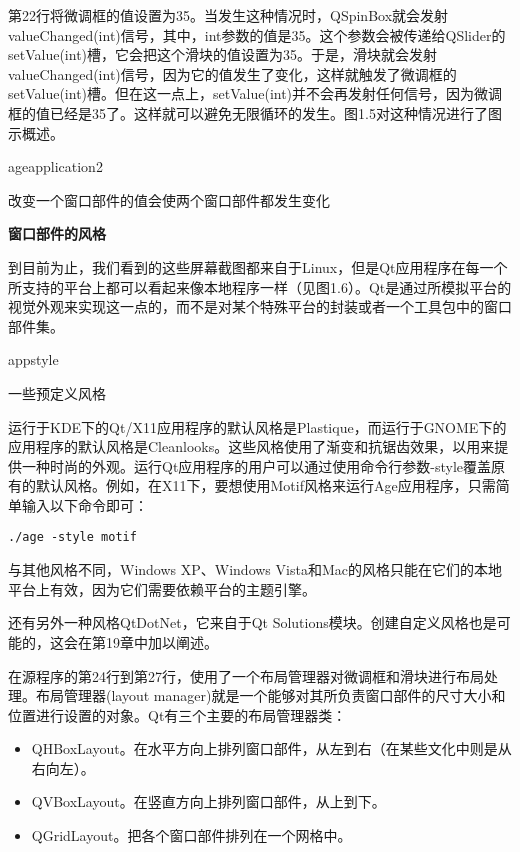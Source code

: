 \documentclass[11pt,oneside]{book}
\begin{document}
\begin{common-format}
第22行将微调框的值设置为35。当发生这种情况时，QSpinBox就会发射valueChanged(int)信号，其中，int参数的值是35。这个参数会被传递给QSlider的setValue(int)槽，它会把这个滑块的值设置为35。于是，滑块就会发射valueChanged(int)信号，因为它的值发生了变化，这样就触发了微调框的setValue(int)槽。但在这一点上，setValue(int)并不会再发射任何信号，因为微调框的值已经是35了。这样就可以避免无限循环的发生。图1.5对这种情况进行了图示概述。
\begin{fig}[0.8]{ageapplication2}
\caption{改变一个窗口部件的值会使两个窗口部件都发生变化}
\label{fig:ageapplication2}
\end{fig}


\begin{framed}
\vspace{-\parskip}
\begin{center}
\textbf{窗口部件的风格}
\end{center}

到目前为止，我们看到的这些屏幕截图都来自于Linux，但是Qt应用程序在每一个所支持的平台上都可以看起来像本地程序一样（见图1.6）。Qt是通过所模拟平台的视觉外观来实现这一点的，而不是对某个特殊平台的封装或者一个工具包中的窗口部件集。

\begin{linefig}[0.9]{appstyle}
\caption{一些预定义风格}
\label{fig:appstyle}
\end{linefig}

运行于KDE下的Qt/X11应用程序的默认风格是Plastique，而运行于GNOME下的应用程序的默认风格是Cleanlooks。这些风格使用了渐变和抗锯齿效果，以用来提供一种时尚的外观。运行Qt应用程序的用户可以通过使用命令行参数-style覆盖原有的默认风格。例如，在X11下，要想使用Motif风格来运行Age应用程序，只需简单输入以下命令即可：
\begin{Verbatim}
./age -style motif
\end{Verbatim}

与其他风格不同，Windows XP、Windows Vista和Mac的风格只能在它们的本地平台上有效，因为它们需要依赖平台的主题引擎。

还有另外一种风格QtDotNet，它来自于Qt Solutions模块。创建自定义风格也是可能的，这会在第19章中加以阐述。
\end{framed}

在源程序的第24行到第27行，使用了一个布局管理器对微调框和滑块进行布局处理。布局管理器(layout manager)就是一个能够对其所负责窗口部件的尺寸大小和位置进行设置的对象。Qt有三个主要的布局管理器类：
\begin{itemize}
\item QHBoxLayout。在水平方向上排列窗口部件，从左到右（在某些文化中则是从右向左）。
\item QVBoxLayout。在竖直方向上排列窗口部件，从上到下。
\item QGridLayout。把各个窗口部件排列在一个网格中。
\end{itemize}


\end{common-format}
\end{document}
